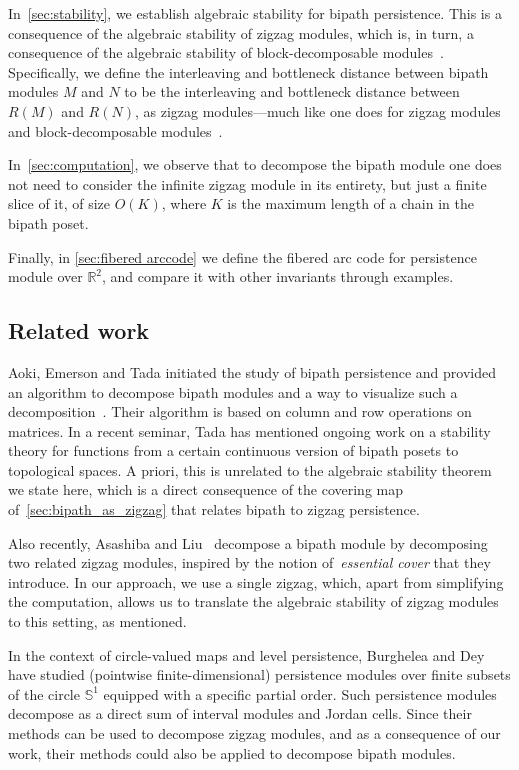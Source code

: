 \documentclass[a4paper,english,reqno]{amsart}
\newcommand\R{\mathbb{R}}
\newcommand\bS{\mathbb{S}}
\theoremstyle{plain}
\theoremstyle{definition} %
\begin{document}
In~\cref{sec:stability}, we establish algebraic stability for bipath persistence. This is a consequence of the algebraic stability of zigzag modules, which is, in turn, a consequence of the algebraic stability of block-decomposable modules~\cite{botnanAlgebraicStabilityZigzag2018,bjerkevikStabilityIntervalDecomposable2021}. Specifically, we define the interleaving and bottleneck distance between bipath modules $M$ and $N$ to be the interleaving and bottleneck distance between $R(M)$ and $R(N)$, as zigzag modules---much like one does for zigzag modules and block-decomposable modules~\cite{botnanAlgebraicStabilityZigzag2018,bjerkevikStabilityIntervalDecomposable2021}.

In~\cref{sec:computation}, we observe that to decompose the bipath module one does not need to consider the infinite zigzag module in its entirety, but just a finite slice of it, of size $O(K)$, where $K$ is the maximum length of a chain in the bipath poset.

Finally, in \cref{sec:fibered arccode} we define the fibered arc code for
persistence module over $\R^{2}$, and compare it with other invariants through
examples.

\subsection{Related work}

Aoki, Emerson and Tada initiated the study of bipath persistence and provided an algorithm to decompose bipath modules and a way to visualize such a decomposition~\cite{aokiBipathPersistence2024}. Their algorithm is based on column and row operations on matrices. In a recent seminar, Tada \cite{Tada2024APATG} has mentioned ongoing work on a stability theory for functions from a certain continuous version of bipath posets to topological spaces. A priori, this is unrelated to the algebraic stability theorem we state here, which is a direct consequence of the covering map of~\cref{sec:bipath_as_zigzag} that relates bipath to zigzag persistence.

Also recently, Asashiba and
Liu~\cite{asashibaIntervalMultiplicitiesPersistence2024} decompose a bipath module by decomposing two related zigzag modules, inspired by the notion of~\textit{essential cover} that they introduce. In our approach, we use a single zigzag, which, apart from simplifying the computation, allows us to translate the algebraic stability of zigzag modules to this setting, as mentioned.

In the context of circle-valued maps and level persistence, Burghelea and
Dey~\cite{burgheleaTopologicalPersistenceCircleValued2013} have studied
(pointwise finite-dimensional) persistence modules over finite subsets of the
circle $\bS^{1}$ equipped with a specific partial order. Such persistence modules decompose as a direct sum of interval modules and Jordan cells. Since their methods can be used to decompose zigzag modules, and as a consequence of our work, their methods could also be applied to decompose bipath modules. 
\end{document}
